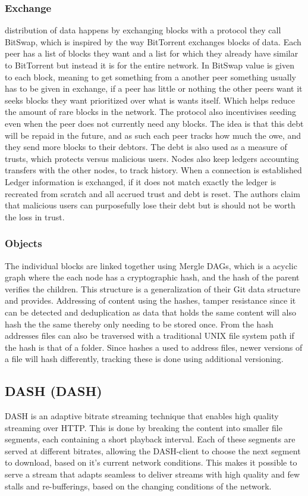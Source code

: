 \subsubsection{Exchange}
distribution of data happens by exchanging blocks with a protocol they call BitSwap, which is inspired by the way BitTorrent exchanges blocks of data. Each peer has a list of blocks they want and a list for which they already have similar to BitTorrent but instead it is for the entire network. In BitSwap value is given to each block, meaning to get something from a another peer something usually has to be given in exchange, if a peer has little or nothing the other peers want it seeks blocks they want prioritized over what is wants itself. Which helps reduce the amount of rare blocks in the network.
The protocol also incentivises seeding even when the peer does not currently need any blocks. The idea is that this debt will be repaid in the future, and as such each peer tracks how much the owe, and they send more blocks to their debtors. The debt is also used as a measure of trusts, which protects versus malicious users.
Nodes also keep ledgers accounting transfers with the other nodes, to track history. When a connection is established Ledger information is exchanged, if it does not match exactly the ledger is recreated from scratch and all accrued trust and debt is reset. The authors claim that malicious users can purposefully lose their debt but is should not be worth the loss in trust.

\subsubsection{Objects}
The individual blocks are linked together using Mergle DAGs, which is a acyclic graph where the each node has a cryptographic hash, and the hash of the parent verifies the children. This structure is a generalization of their Git data structure and provides. Addressing of content using the hashes, tamper resistance since it can be detected and deduplication as data that holds the same content will also hash the the same thereby only needing to be stored once. From the hash addresses files can also be traversed with a traditional UNIX file system path if the hash is that of a folder.
Since hashes a used to address files, newer versions of a file will hash differently, tracking these is done using additional versioning.


\subsection{\acl{DASH} (\acs{DASH})}
\ac{DASH} is an adaptive bitrate streaming technique that enables high quality streaming over \acs{HTTP}. This is done by breaking the content into smaller file segments, each containing a short playback interval. Each of these segments are served at different bitrates, allowing the \acs{DASH}-client to choose the next segment to download, based on it's current network conditions.
This makes it possible to serve a stream that adapts seamless to deliver streams with high quality and few stalls and re-bufferings, based on the changing conditions of the network.

